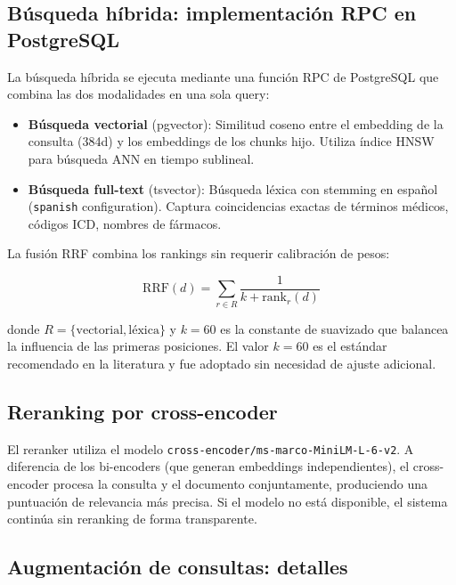 \subsection{Búsqueda híbrida: implementación RPC en PostgreSQL}

La búsqueda híbrida se ejecuta mediante una función RPC de PostgreSQL que combina las dos modalidades en una sola query:

\begin{itemize}[nosep, leftmargin=*]
  \item \textbf{Búsqueda vectorial} (pgvector): Similitud coseno entre el embedding de la consulta (384d) y los embeddings de los chunks hijo. Utiliza índice \ac{HNSW} para búsqueda ANN en tiempo sublineal.
  \item \textbf{Búsqueda full-text} (tsvector): Búsqueda léxica con stemming en español (\texttt{spanish} configuration). Captura coincidencias exactas de términos médicos, códigos \ac{ICD}, nombres de fármacos.
\end{itemize}

La fusión \ac{RRF} combina los rankings sin requerir calibración de pesos:

\begin{equation}
\text{RRF}(d) = \sum_{r \in R} \frac{1}{k + \text{rank}_r(d)}
\end{equation}

donde $R = \{\text{vectorial}, \text{léxica}\}$ y $k = 60$ es la constante de suavizado que balancea la influencia de las primeras posiciones. El valor $k=60$ es el estándar recomendado en la literatura \parencite{cormack2009rrf} y fue adoptado sin necesidad de ajuste adicional.

\subsection{Reranking por cross-encoder}

El reranker utiliza el modelo \texttt{cross-encoder/ms-marco-MiniLM-L-6-v2}. A diferencia de los bi-encoders (que generan embeddings independientes), el cross-encoder procesa la consulta y el documento conjuntamente, produciendo una puntuación de relevancia más precisa. Si el modelo no está disponible, el sistema continúa sin reranking de forma transparente.

\subsection{Augmentación de consultas: detalles}

